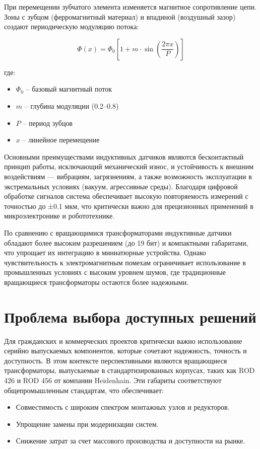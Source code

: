 При перемещении зубчатого элемента изменяется магнитное сопротивление цепи. Зоны с зубцом (ферромагнитный материал) и впадиной (воздушный зазор) создают 
периодическую модуляцию потока:

\begin{equation}
    \Phi(x) = \Phi_0 \left[ 1 + m \cdot \sin\left(\frac{2\pi x}{P}\right) \right]
\end{equation}

где:
\begin{itemize}
    \item $\Phi_0$ -- базовый магнитный поток
    \item $m$ -- глубина модуляции (0.2–0.8)
    \item $P$ -- период зубцов
    \item $x$ -- линейное перемещение
\end{itemize}

Основными преимуществами индуктивных датчиков являются бесконтактный принцип работы, исключающий механический износ, и устойчивость к внешним воздействиям — вибрациям, загрязнениям, 
а также возможность эксплуатации в экстремальных условиях (вакуум, агрессивные среды). Благодаря цифровой обработке сигналов система обеспечивает высокую повторяемость измерений 
с точностью до ±0.1 мкм, что критически важно для прецизионных применений в микроэлектронике и робототехнике.

По сравнению с вращающимися трансформаторами индуктивные датчики обладают более высоким разрешением (до 19 бит) и компактными габаритами, что упрощает их интеграцию в миниатюрные устройства. 
Однако  чувствительность к электромагнитным помехам ограничивает использование в промышленных условиях с высоким уровнем шумов, где традиционные вращающиеся трансформаторы 
остаются более надежными.

\section{Проблема выбора доступных решений}
Для гражданских и коммерческих проектов критически важно использование серийно выпускаемых компонентов, которые сочетают надежность, точность и доступность. 
В этом контексте перспективными являются вращающиеся трансформаторы, выпускаемые в стандартизированных корпусах, таких как ROD 426 и ROD 456 от компании Heidenhain. 
Эти габариты соответствуют общепромышленным стандартам, что обеспечивает:

\begin{itemize} 
  \item Совместимость с широким спектром монтажных узлов и редукторов.
  \item Упрощение замены при модернизации систем.
  \item Снижение затрат за счет массового производства и доступности на рынке.
\end{itemize}

